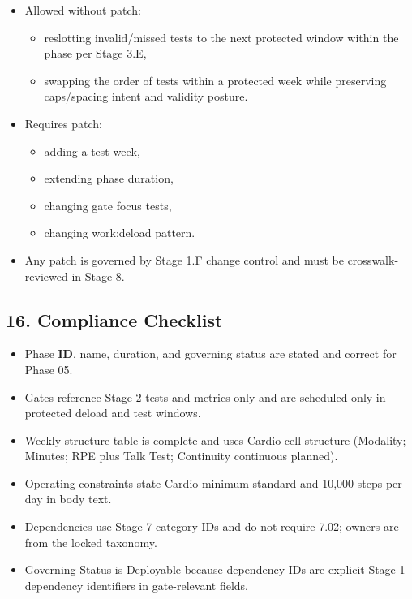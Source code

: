 \documentclass[10pt]{article}
\begin{document}
\begin{itemize}
\item Allowed without patch:
\begin{itemize}
\item reslotting invalid/missed tests to the next protected window within the phase per Stage 3.E,
\item swapping the order of tests within a protected week while preserving caps/spacing intent and validity posture.
\end{itemize}
\item Requires patch:
\begin{itemize}
\item adding a test week,
\item extending phase duration,
\item changing gate focus tests,
\item changing work:deload pattern.
\end{itemize}
\item Any patch is governed by Stage 1.F change control and must be crosswalk-reviewed in Stage 8.
\end{itemize}

\subsection*{16. Compliance Checklist}

\begin{itemize}
\item Phase \textbf{ID}, name, duration, and governing status are stated and correct for Phase 05.
\item Gates reference Stage 2 tests and metrics only and are scheduled only in protected deload and test windows.
\item Weekly structure table is complete and uses Cardio cell structure (Modality; Minutes; RPE plus Talk Test; Continuity continuous planned).
\item Operating constraints state Cardio minimum standard and 10,000 steps per day in body text.
\item Dependencies use Stage 7 category IDs and do not require 7.02; owners are from the locked taxonomy.
\item Governing Status is Deployable because dependency IDs are explicit Stage 1 dependency identifiers in gate-relevant fields.
\end{itemize}
\end{document}
